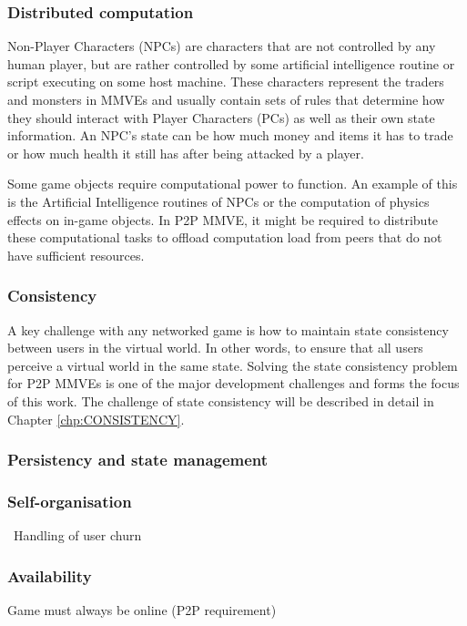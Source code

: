 \subsubsection{Distributed computation}

Non-Player Characters (NPCs) are characters that are not controlled by any human player, but are rather controlled by some artificial intelligence routine or script executing on some host machine. These characters represent the traders and monsters in MMVEs and usually contain sets of rules that determine how they should interact with Player Characters (PCs) as well as their own state information. An NPC's state can be how much money and items it has to trade or how much health it still has after being attacked by a player.

Some game objects require computational power to function. An example of this is the Artificial Intelligence routines of NPCs or the computation of physics effects on in-game objects. In P2P MMVE, it might be required to distribute these computational tasks to offload computation load from peers that do not have sufficient resources.

\subsubsection{Consistency}
A key challenge with any networked game is how to maintain state consistency between users in the virtual world. In other words, to ensure that all users perceive a virtual world in the same state. Solving the state consistency problem for P2P MMVEs is one of the major development challenges and forms the focus of this work. The challenge of state consistency will be described in detail in Chapter \ref{chp:CONSISTENCY}.

\subsubsection{Persistency and state management}

\subsubsection{Self-organisation}\
Handling of user churn

\subsubsection{Availability}
Game must always be online (P2P requirement)


